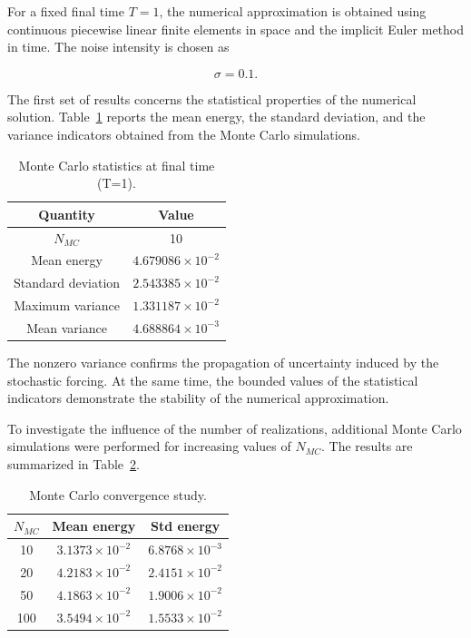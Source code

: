 For a fixed final time \(T=1\), the numerical approximation is obtained using 
continuous piecewise linear finite elements in space and the implicit Euler method 
in time. The noise intensity is chosen as

\[
\sigma = 0.1.
\]

The first set of results concerns the statistical properties of the numerical solution. 
Table~\ref{tab:mc_statistics} reports the mean energy, the standard deviation, and the 
variance indicators obtained from the Monte Carlo simulations.

\begin{table}[ht]
\centering
\caption{Monte Carlo statistics at final time (T=1).}
\label{tab:mc_statistics}
\begin{tabular}{cc}
\hline
Quantity & Value \\
\hline
$N_{MC}$ & 10 \\
Mean energy & $4.679086\times10^{-2}$ \\
Standard deviation & $2.543385\times10^{-2}$ \\
Maximum variance & $1.331187\times10^{-2}$ \\
Mean variance & $4.688864\times10^{-3}$ \\
\hline
\end{tabular}
\end{table}

The nonzero variance confirms the propagation of uncertainty induced by the stochastic forcing. 
At the same time, the bounded values of the statistical indicators demonstrate the stability of 
the numerical approximation.

To investigate the influence of the number of realizations, additional Monte Carlo simulations 
were performed for increasing values of \(N_{MC}\). The results are summarized in 
Table~\ref{tab:mc_convergence}.

\begin{table}[ht]
\centering
\caption{Monte Carlo convergence study.}
\label{tab:mc_convergence}
\begin{tabular}{ccc}
\hline
$N_{MC}$ & Mean energy & Std energy\\
\hline
10  & $3.1373\times10^{-2}$ & $6.8768\times10^{-3}$\\
20  & $4.2183\times10^{-2}$ & $2.4151\times10^{-2}$\\
50  & $4.1863\times10^{-2}$ & $1.9006\times10^{-2}$\\
100 & $3.5494\times10^{-2}$ & $1.5533\times10^{-2}$\\
\hline
\end{tabular}
\end{table}


